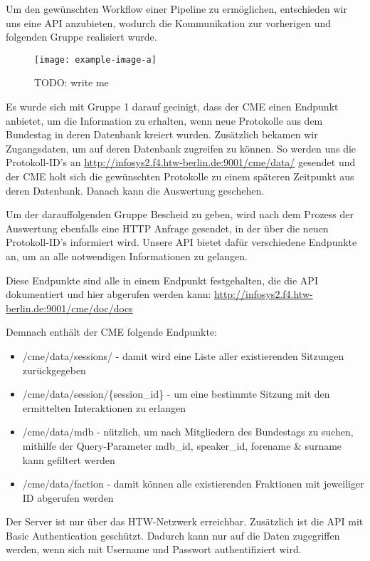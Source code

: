 Um den gewünschten Workflow einer Pipeline zu ermöglichen, entschieden wir
uns eine API anzubieten, wodurch die Kommunikation zur vorherigen und
folgenden Gruppe realisiert wurde.

\begin{figure}[ht]
    \begin{center}
        \texttt{[image: example-image-a]}
    \end{center}
    \caption{TODO: write me}
    \label{fig:02_api_call_flow}
\end{figure}

Es wurde sich mit Gruppe 1 darauf geeinigt, dass der CME einen Endpunkt
anbietet, um die Information zu erhalten, wenn neue Protokolle aus dem
Bundestag in deren Datenbank kreiert wurden. Zusätzlich bekamen wir
Zugangsdaten, um auf deren Datenbank zugreifen zu können. So werden uns die
Protokoll-ID's an \url{http://infosys2.f4.htw-berlin.de:9001/cme/data/} gesendet
und der CME holt sich die gewünschten Protokolle zu einem späteren Zeitpunkt
aus deren Datenbank. Danach kann die Auswertung geschehen.

Um der darauffolgenden Gruppe Bescheid zu geben, wird nach dem Prozess der
Auswertung ebenfalls eine HTTP Anfrage gesendet, in der über die neuen
Protokoll-ID's informiert wird. Unsere API bietet dafür verschiedene Endpunkte
an, um an alle notwendigen Informationen zu gelangen.

Diese Endpunkte sind alle in einem Endpunkt festgehalten, die die API
dokumentiert und hier abgerufen werden kann:
\url{http://infosys2.f4.htw-berlin.de:9001/cme/doc/docs}

Demnach enthält der CME folgende Endpunkte:
\begin{itemize}
    \item /cme/data/sessions/ - damit wird eine Liste aller existierenden
        Sitzungen zurückgegeben
    \item /cme/data/session/\{session\_id\} - um eine bestimmte Sitzung mit den
        ermittelten Interaktionen zu erlangen
    \item /cme/data/mdb - nützlich, um nach Mitgliedern des Bundestags zu
        suchen, mithilfe der Query-Parameter mdb\_id, speaker\_id, forename
        \& surname kann gefiltert werden
    \item /cme/data/faction - damit können alle existierenden Fraktionen mit
        jeweiliger ID abgerufen werden
\end{itemize}

Der Server ist nur über das HTW-Netzwerk erreichbar. Zusätzlich ist die API mit
Basic Authentication geschützt. Dadurch kann nur auf die Daten zugegriffen
werden, wenn sich mit Username und Passwort authentifiziert wird.


